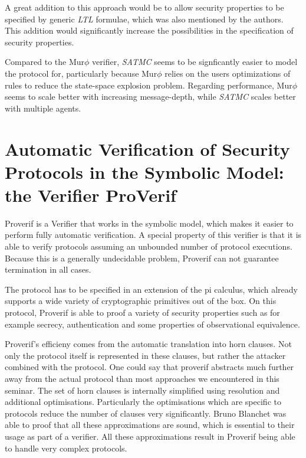 \documentclass[a4paper,UKenglish]{lipics-v2018}
\def\murphi{Mur$\phi$ }
\begin{document}
A great addition to this approach would be to allow security properties to be specified by generic \textit{LTL} formulae, which was also mentioned by the authors. This addition would significantly increase the possibilities in the specification of security properties.

Compared to the \murphi verifier, \textit{SATMC} seems to be signficantly easier to model the protocol for, particularly because \murphi relies on the users optimizations of rules to reduce the state-space explosion problem. Regarding performance, \murphi seems to scale better with increasing message-depth, while \textit{SATMC} scales better with multiple agents.






\newpage
\section{Automatic Verification of Security Protocols in the Symbolic Model: the Verifier ProVerif}

Proverif is a Verifier that works in the symbolic model, which makes it easier to perform fully automatic verification. A special property of this verifier is that it is able to verify protocols assuming an unbounded number of protocol executions. Because this is a generally undecidable problem, Proverif can not guarantee termination in all cases.\cite{ProVerif}

The protocol has to be specified in an extension of the pi calculus, which already supports a wide variety of cryptographic primitives out of the box. On this protocol, Proverif is able to proof a variety of security properties such as for example secrecy, authentication and some properties of observational equivalence.\cite{ProVerif}

Proverif's efficieny comes from the automatic translation into horn clauses. Not only the protocol itself is represented in these clauses, but rather the attacker combined with the protocol. One could say that proverif abstracts much further away from the actual protocol than most approaches we encountered in this seminar. The set of horn clauses is internally simplified using resolution and additional optimisations. Particularly the optimisations which are specific to protocols reduce the number of clauses very significantly. Bruno Blanchet was able to proof that all these approximations are sound, which is essential to their usage as part of a verifier. All these approximations result in Proverif being able to handle very complex protocols.\cite{ProVerif}
\end{document}
